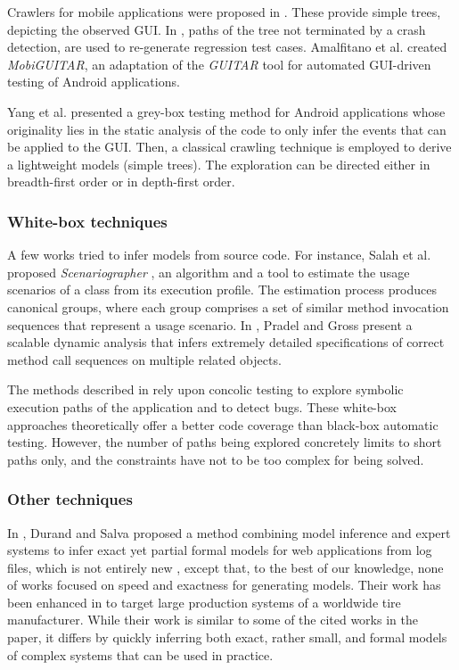 Crawlers for mobile applications were proposed in
\cite{Amalfitano:2012:UGR:2351676.2351717,Joorabchi:2012:REI:2420240.2420457,MobiGUITARIEEESoftware2014}.
These provide simple trees, depicting the observed GUI. In
\cite{Amalfitano:2012:UGR:2351676.2351717}, paths of the tree not
terminated by a crash detection, are used to re-generate
regression test cases. Amalfitano et al. created
\textit{MobiGUITAR}, an adaptation of the \textit{GUITAR} tool
for automated GUI-driven testing of Android applications.

Yang et al. \cite{WPX13} presented a grey-box testing method for
Android applications whose originality lies in the static
analysis of the code to only infer the events that can be applied
to the GUI. Then, a classical crawling technique is employed to
derive a lightweight models (simple trees). The exploration can
be directed either in breadth-first order or in depth-first
order.


\subsubsection{White-box techniques}
\label{sec:related:modelinf:passive-white}

A few works tried to infer models from source code. For instance,
Salah et al. proposed \textit{Scenariographer}
\cite{Salah05scenariographer}, an algorithm and a tool to
estimate the usage scenarios of a class from its execution
profile. The estimation process produces canonical groups, where
each group comprises a set of similar method invocation sequences
that represent a usage scenario.
In \cite{Pradel:2009}, Pradel and Gross present a scalable
dynamic analysis that infers extremely detailed specifications of
correct method call sequences on multiple related objects.

The methods described in \cite{concolicandroid12,5416728} rely
upon concolic testing to explore symbolic execution paths of the
application and to detect bugs. These white-box approaches
theoretically offer a better code coverage than black-box
automatic testing. However, the number of paths being explored
concretely limits to short paths only, and the constraints have
not to be too complex for being solved.


\subsubsection{Other techniques}
\label{sec:related:modelinf:passive-others}

In \cite{DBLP:conf/soict/DurandS14}, Durand and Salva proposed a
method combining model inference and expert systems to infer
exact yet partial formal models for web applications from log
files, which is not entirely new
\cite{Andrews00broad-spectrumstudies}, except that, to the best
of our knowledge, none of works focused on speed and exactness
for generating models.
Their work has been enhanced in \cite{DBLP:conf/debs/SalvaD15} to
target large production systems of a worldwide tire manufacturer.
While their work is similar to some of the cited works in the
paper, it differs by quickly inferring both exact, rather small,
and formal models of complex systems that can be used in
practice.
